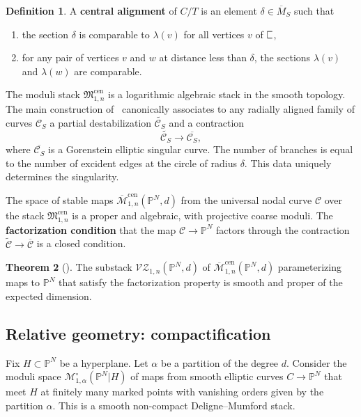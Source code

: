 \documentclass[11pt]{amsart}
\newcommand{\plC}{\scalebox{0.8}[1.3]{$\sqsubset$}}
\renewcommand{\to}{\rightarrow}
\theoremstyle{definition}
\newtheorem{thm}{Theorem}[section]
\theoremstyle{definition}
\newtheorem{definition}[thm]{Definition}
\begin{document}
\begin{definition}
A \textbf{central alignment} of $C/T$ is an element $\delta\in\overline{M}_S$ such that
\begin{enumerate}
    \item the section $\delta$ is comparable to $\lambda(v)$ for all vertices $v$ of $\plC$,
    \item for any pair of vertices $v$ and $w$ at distance less than $\delta$, the sections $\lambda(v)$ and $\lambda(w)$ are comparable.
\end{enumerate}
\end{definition}

The moduli stack $\mathfrak M_{1,n}^{\mathrm{cen}}$ is a logarithmic algebraic stack in the smooth topology. The main construction of~\cite{RSPW} canonically associates to any radially aligned family of curves $\mathcal C_S$ a partial destabilization $\widetilde{\mathcal C_S}$ and a contraction
\[
\widetilde{\mathcal C_S}\to \overline{\mathcal C_S},
\]
where $\overline{\mathcal C_S}$ is a Gorenstein elliptic singular curve. The number of branches is equal to the number of excident edges at the circle of radius $\delta$. This data uniquely determines the singularity.

The space of stable maps $\overline{\mathcal M}^{\mathrm{cen}}_{1,n}(\mathbb P^N,d)$ from the universal nodal curve $\mathcal C$ over the stack $\mathfrak M_{1,n}^{\mathrm{cen}}$ is a proper and algebraic, with projective coarse moduli. The \textbf{factorization condition} that the map $\mathcal C\to \mathbb P^N$ factors through the contraction $\widetilde{\mathcal C}\to \overline{\mathcal C}$ is a closed condition. 
\begin{thm}[{\cite[Theorem B]{RSPW}}]
The substack $\mathcal{VZ}_{1,n}(\mathbb P^N,d)$ of $\overline{\mathcal M}^{\mathrm{cen}}_{1,n}(\mathbb P^N,d)$ parameterizing maps to $\mathbb P^N$ that satisfy the factorization property is smooth and proper of the expected dimension.
\end{thm}

\subsection{Relative geometry: compactification} Fix $H\subset \mathbb P^N$ be a hyperplane. Let $\alpha$ be a partition of the degree $d$. Consider the moduli space $\mathcal M_{1,\alpha}^\circ(\mathbb P^N|H)$ of maps from smooth elliptic curves $C\to \mathbb P^N$ that meet $H$ at finitely many marked points with vanishing orders given by the partition $\alpha$. This is a smooth non-compact Deligne--Mumford stack. 
\end{document}
